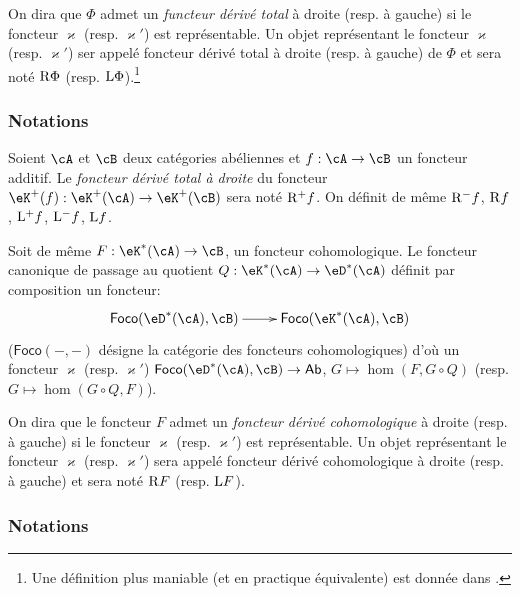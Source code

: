 \begin{definition}\label{VIII:4-1-2}
On dira que $\Phi$ admet un \emph{functeur dérivé total} à droite (resp. 
à gauche) si le foncteur $\varkappa$ (resp. $\varkappa'$) est représentable. Un objet 
représentant le foncteur $\varkappa$ (resp. $\varkappa'$) ser appelé foncteur dérivé 
total à droite (resp. à gauche) de $\Phi$ et sera noté 
$\mathrm{R} \Phi$ (resp. $\mathrm{L} \Phi$).\footnote{Une définition plus maniable (et en 
practique équivalente) est donnée dans \cite[XVII 1.2]{sga4}.}
\end{definition}





\subsubsection{Notations}\label{VIII:4-1-3}

Soient $\cA$ et $\cB$ deux catégories abéliennes et $f:\cA\to \cB$ un 
foncteur additif. Le \emph{foncteur dérivé total à droite} du foncteur 
$\eK^+(f):\eK^+(\cA) \to \eK^+(\cB)$ sera noté $\mathrm{R}^+ f$. On définit de 
même $\mathrm{R}^- f$, $\mathrm{R} f$, $\mathrm{L}^+ f$, $\mathrm{L}^- f$, $\mathrm{L} f$. 

Soit de même $F:\eK^\ast(\cA) \to \cB$, un foncteur cohomologique. Le 
foncteur canonique de passage au quotient $Q:\eK^\ast(\cA) \to \eD^\ast(\cA)$ 
définit par composition un foncteur: 
\[\xymatrix{
  \mathsf{Foco}(\eD^\ast(\cA),\cB) \ar[r] 
    & \mathsf{Foco}(\eK^\ast(\cA),\cB) 
}\]
($\mathsf{Foco}(-,-)$ désigne la catégorie des foncteurs cohomologiques) 
d'où un foncteur $\varkappa$ (resp. $\varkappa'$) 
$\mathsf{Foco}(\eD^\ast(\cA),\cB) \to \mathsf{Ab}$, $G\mapsto \hom(F,G\circ Q)$ 
(resp. $G\mapsto \hom(G\circ Q,F)$). 





\begin{definition}\label{VIII:4-1-4}
On dira que le foncteur $F$ admet un \emph{foncteur dérivé cohomologique} 
à droite (resp. à gauche) si le foncteur $\varkappa$ (resp. $\varkappa'$) est 
représentable. Un objet représentant le foncteur $\varkappa$ (resp. $\varkappa'$) sera 
appelé foncteur dérivé cohomologique à droite (resp. à gauche) et 
sera noté $\mathrm{R} F$ (resp. $\mathrm{L} F$). 
\end{definition}





\subsubsection{Notations}\label{VIII:4-1-5}

